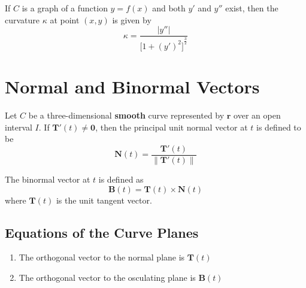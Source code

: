 \documentclass{article}
\begin{document}
If $C$ is a graph of a function $y=f(x)$ and both $y'$ and $y''$ exist, then the curvature $\kappa$ at point $(x, y)$ is given by
\[\kappa = \frac{|y''|}{{\Big[1+{(y')}^2\Big]}^\frac{3}{2}}\]

\pagebreak

\section*{Normal and Binormal Vectors}

Let $C$ be a three-dimensional \textbf{smooth} curve represented by $\mathbf{r}$ over an open interval $I$. If $\mathbf{T}'(t)\neq\mathbf{0}$, then the principal unit normal vector at $t$ is defined to be
\[\mathbf{N}(t)=\frac{\mathbf{T}'(t)}{\|\mathbf{T}'(t)\|}\]

The binormal vector at $t$ is defined as
\[\mathbf{B}(t)=\mathbf{T}(t)\times\mathbf{N}(t)\]
where $\mathbf{T}(t)$ is the unit tangent vector.

\subsection*{Equations of the Curve Planes}
\begin{enumerate}
    \item The orthogonal vector to the normal plane is $\mathbf{T}(t)$
    \item The orthogonal vector to the osculating plane is $\mathbf{B}(t)$
\end{enumerate}
\end{document}
